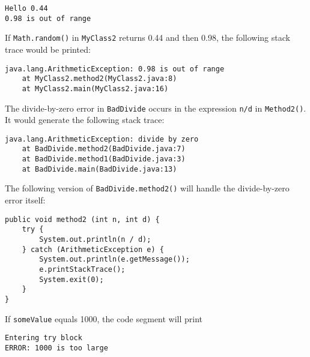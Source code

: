 \begin{ANS}
\begin{jjjlisting}
\begin{lstlisting}
Hello 0.44
0.98 is out of range
\end{lstlisting}
\end{jjjlisting}

\item  If {\tt Math.random()} in {\tt MyClass2} returns 0.44 and then
0.98, the following stack trace would be printed:

\begin{jjjlisting}
\begin{lstlisting}
java.lang.ArithmeticException: 0.98 is out of range
    at MyClass2.method2(MyClass2.java:8)
    at MyClass2.main(MyClass2.java:16)
\end{lstlisting}
\end{jjjlisting}

\item  The divide-by-zero error in {\tt BadDivide} occurs
in the expression {\tt n/d} in {\tt Method2()}. It would
generate the following stack trace:

\begin{jjjlisting}
\begin{lstlisting}
java.lang.ArithmeticException: divide by zero
    at BadDivide.method2(BadDivide.java:7)
    at BadDivide.method1(BadDivide.java:3)
    at BadDivide.main(BadDivide.java:13)
\end{lstlisting}
\end{jjjlisting}

\item  The following version of {\tt BadDivide.method2()}
will handle the divide-by-zero error itself:

\begin{jjjlisting}
\begin{lstlisting}
public void method2 (int n, int d) {
    try {
        System.out.println(n / d);
    } catch (ArithmeticException e) {
        System.out.println(e.getMessage());
        e.printStackTrace();
        System.exit(0);
    }
}
\end{lstlisting}
\end{jjjlisting}

\item  If {\tt someValue} equals 1000, the code segment will print

\begin{jjjlisting}
\begin{lstlisting}
Entering try block
ERROR: 1000 is too large
\end{lstlisting}
\end{jjjlisting}


\end{ANS}
